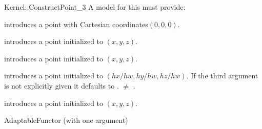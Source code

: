 \begin{ccRefFunctionObjectConcept}{Kernel::ConstructPoint_3}
A model for this must provide:


            {introduces a point with Cartesian coordinates$(0,0,0)$.}

\ccHidden{}
            {introduces a point  initialized to $(x,y,z)$.}

\ccHidden{}
            {introduces a point  initialized to $(x,y,z)$.}

\ccHidden{}
            {introduces a point  initialized to $(hx/hw,hy/hw, hz/hw)$.
             If the third argument is not explicitly given it defaults
             to .
             \ccPrecond {} $\neq$ . }

\ccHidden{}
            {introduces a point  initialized to $(x,y,z)$.}

\ccRefines
AdaptableFunctor (with one argument)

\ccSeeAlso
{} \\

\end{ccRefFunctionObjectConcept}
